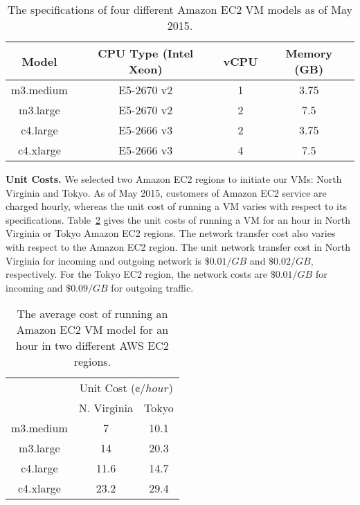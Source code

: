 \documentclass{llncs}
\begin{document}
\vspace{-0.4cm}
\begin{table}[hbt]
	\scriptsize
	\centering
	\begin{tabular}{|c|c|c|c|}

	\hline
	Model & CPU Type (Intel Xeon) &  vCPU & Memory (GB) \\
	\hline
	m3.medium	& E5-2670 v2 & 1 & 3.75 \\
	m3.large		& E5-2670 v2 & 2 & 7.5 \\
	c4.large		& E5-2666 v3 & 2 & 3.75 \\
	c4.xlarge		& E5-2666 v3 & 4 & 7.5 \\
	\hline
	\end{tabular}

	\caption{The specifications of four different Amazon EC2 VM models as of May 2015.}
	\label{table:cost:ec2_types}
\end{table}

\vspace{-0.9cm}
\textbf{Unit Costs.} We selected two Amazon EC2 regions to initiate our VMs: North Virginia and Tokyo. As of May 2015, customers of Amazon EC2 service are charged hourly, whereas the unit cost of running a VM varies with respect to its specifications. Table~\ref{table:cost:ec2_cost} gives the unit costs of running a VM for an hour in North Virginia or Tokyo Amazon EC2 regions. The network transfer cost also varies with respect to the Amazon EC2 region. The unit network transfer cost in North Virginia for incoming and outgoing network is $\$0.01/GB$ and $\$0.02/GB$, respectively. For the Tokyo EC2 region, the network costs are $\$0.01/GB$ for incoming and $\$0.09/GB$ for outgoing traffic.

\vspace{-0.3cm}
\begin{table}[hbt]
	\scriptsize
	\centering
	\begin{tabular}{|c|c|c|}
	\cline{2-3}
	\multicolumn{1}{c}{} & \multicolumn{2}{|c|}{Unit Cost ($\cent/hour$)} \\
	\cline{2-3}
	\multicolumn{1}{c|}{} & N. Virginia & Tokyo \\
	\hline
	m3.medium	& 7		& 10.1 \\
	m3.large		& 14		& 20.3 \\
	c4.large		& 11.6	& 14.7 \\	
	c4.xlarge		& 23.2	& 29.4 \\
	\hline
	\end{tabular}

	\caption{The average cost of running an Amazon EC2 VM model for an hour in two different AWS EC2 regions.}
	\label{table:cost:ec2_cost}
\end{table}
\end{document}
